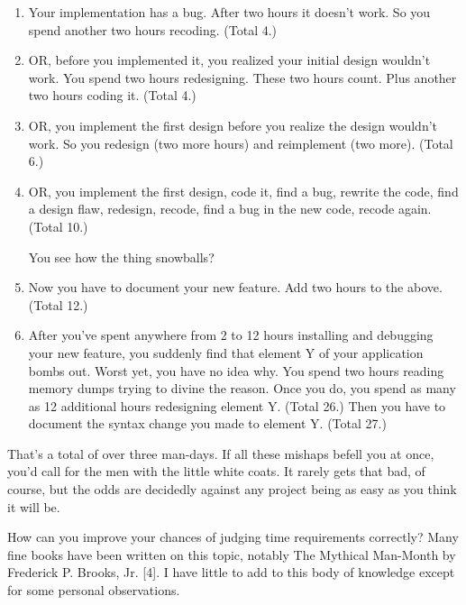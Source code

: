 \begin{enumerate}
\item Your implementation has a bug. After two hours it doesn't work. So you
spend another two hours recoding. (Total 4.)

\item OR, before you implemented it, you realized your initial design wouldn't
work. You spend two hours redesigning. These two hours count. Plus
another two hours coding it. (Total 4.)

\item OR, you implement the first design before you realize the design wouldn't
work. So you redesign (two more hours) and reimplement (two more). (Total 6.)

\item OR, you implement the first design, code it, find a bug, rewrite the code,
find a design flaw, redesign, recode, find a bug in the new code, recode
again. (Total 10.)

You see how the thing snowballs?

\item Now you have to document your new feature. Add two hours to the above. (Total 12.)

\item After you've spent anywhere from 2 to 12 hours installing and debugging
your new feature, you suddenly find that element Y of your application
bombs out. Worst yet, you have no idea why. You spend two hours reading
memory dumps trying to divine the reason. Once you do, you spend as
many as 12 additional hours redesigning element Y. (Total 26.) Then you
have to document the syntax change you made to element Y. (Total 27.)

\end{enumerate}

\noindent That's a total of over three man-days. If all these mishaps befell you at
once, you'd call for the men with the little white coats. It rarely gets that
bad, of course, but the odds are decidedly against any project being as
easy as you think it will be.

How can you improve your chances of judging time requirements
correctly? Many fine books have been written on this topic, notably The
Mythical Man-Month by Frederick P. Brooks, Jr. {[}4{]}. I have little to add
to this body of knowledge except for some personal observations.

